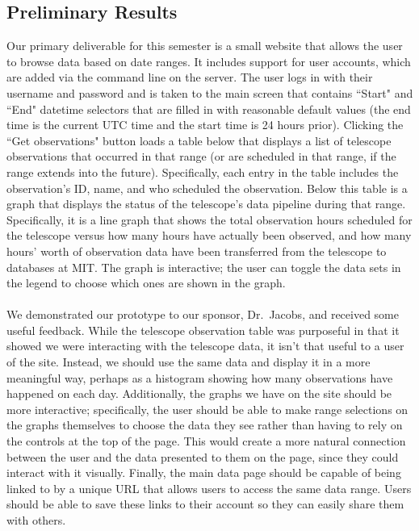 \documentclass[12pt]{article}
\begin{document}
\begin{spacing}{1.5}
\section{Preliminary Results}
Our primary deliverable for this semester is a small website that allows the user to browse data based on date ranges. It includes support for user accounts, which are added via the command line on the server. The user logs in with their username and password and is taken to the main screen that contains ``Start" and ``End" datetime selectors that are filled in with reasonable default values (the end time is the current UTC time and the start time is 24 hours prior). Clicking the ``Get observations" button loads a table below that displays a list of telescope observations that occurred in that range (or are scheduled in that range, if the range extends into the future). Specifically, each entry in the table includes the observation's ID, name, and who scheduled the observation. Below this table is a graph that displays the status of the telescope's data pipeline during that range. Specifically, it is a line graph that shows the total observation hours scheduled for the telescope versus how many hours have actually been observed, and how many hours' worth of observation data have been transferred from the telescope to databases at MIT. The graph is interactive; the user can toggle the data sets in the legend to choose which ones are shown in the graph.
\\ \\
We demonstrated our prototype to our sponsor, Dr.\ Jacobs, and received some useful feedback. While the telescope observation table was purposeful in that it showed we were interacting with the telescope data, it isn't that useful to a user of the site. Instead, we should use the same data and display it in a more meaningful way, perhaps as a histogram showing how many observations have happened on each day. Additionally, the graphs we have on the site should be more interactive; specifically, the user should be able to make range selections on the graphs themselves to choose the data they see rather than having to rely on the controls at the top of the page. This would create a more natural connection between the user and the data presented to them on the page, since they could interact with it visually. Finally, the main data page should be capable of being linked to by a unique URL that allows users to access the same data range. Users should be able to save these links to their account so they can easily share them with others.


\end{spacing}
\end{document}
